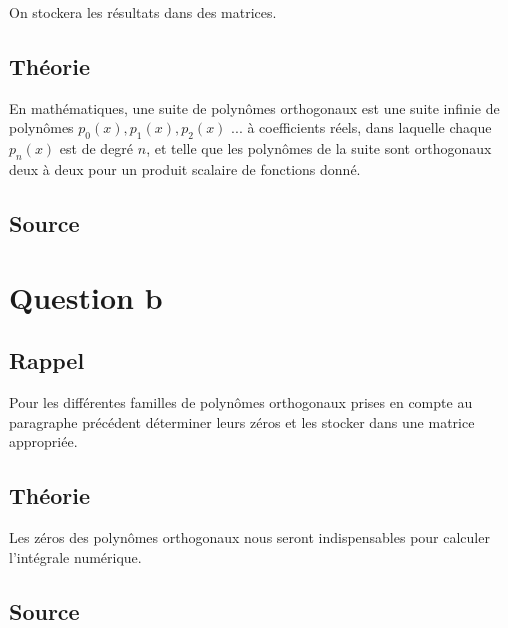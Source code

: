 \documentclass[a4paper,10pt]{report}
\begin{document}
On stockera les résultats dans des matrices.

\subsection*{Théorie}

En mathématiques, une suite de polynômes orthogonaux est une suite infinie de polynômes $p_0(x), p_1(x), p_2(x)$ ... à coefficients réels, dans laquelle chaque $p_n(x)$ est de degré $n$, et telle que les polynômes de la suite sont orthogonaux deux à deux pour un produit scalaire de fonctions donné.

\subsection*{Source}

\begin{center}
	
	
\end{center}

\section*{Question b}

\subsection*{Rappel}

Pour les différentes familles de polynômes orthogonaux prises en compte au paragraphe précédent déterminer leurs zéros et les stocker dans une matrice appropriée.

\subsection*{Théorie}

Les zéros des polynômes orthogonaux nous seront indispensables pour calculer l’intégrale numérique.

\subsection*{Source}
\end{document}
